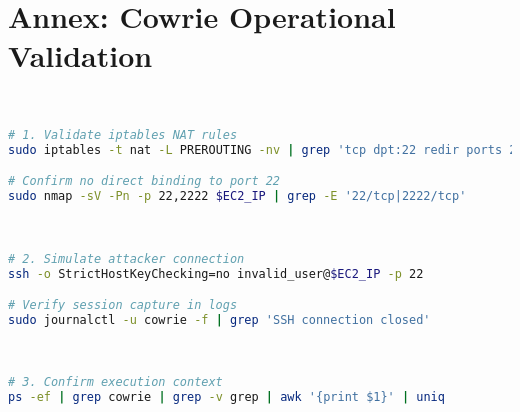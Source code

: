 \newpage

\section{Annex: Cowrie Operational Validation}  
\label{annex:cowrie-validation}  
\
\
\begin{lstlisting}[language=bash,label={lst:cowrie-redirect},caption={Traffic Redirection Verification}]  
# 1. Validate iptables NAT rules  
sudo iptables -t nat -L PREROUTING -nv | grep 'tcp dpt:22 redir ports 2222'  

# Confirm no direct binding to port 22  
sudo nmap -sV -Pn -p 22,2222 $EC2_IP | grep -E '22/tcp|2222/tcp'  
\end{lstlisting}  
\
\begin{lstlisting}[language=bash,label={lst:cowrie-access},caption={Honeypot Engagement Testing}]  
# 2. Simulate attacker connection  
ssh -o StrictHostKeyChecking=no invalid_user@$EC2_IP -p 22  

# Verify session capture in logs  
sudo journalctl -u cowrie -f | grep 'SSH connection closed'  
\end{lstlisting}  
\
\begin{lstlisting}[language=bash,label={lst:cowrie-context},caption={Process Isolation Validation}]  
# 3. Confirm execution context  
ps -ef | grep cowrie | grep -v grep | awk '{print $1}' | uniq  
\end{lstlisting}  
\





